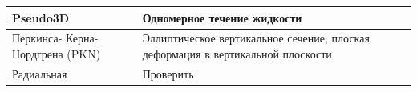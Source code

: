 \begin{longtable}[l]{|L{2.8cm}|L{6.7cm}|L{6.2cm}|}
	Pseudo3D&Одномерное течение жидкости&\hfill\break{}\\ \hline
	Перкинса- Керна- Нордгрена (PKN)&Эллиптическое вертикальное сечение; плоская деформация в вертикальной плоскости&\hfill\break{}\\ \hline
	Радиальная&Проверить&\hfill\break{}\\ \hline

\end{longtable}
